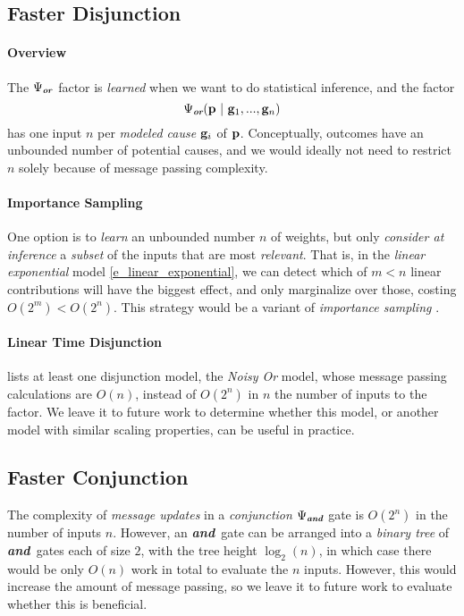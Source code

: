 \documentclass[11pt]{article}
\newcommand{\pvariable}{{\bf p}}
\newcommand{\gvariable}{{\bf g}}
\newcommand{\condsep}{\ |\ }
\newcommand{\opand}{\textbf{\em and}}
\newcommand{\opor}{\textbf{\em or}}
\begin{document}
\subsection{Faster Disjunction}
\label{sec:noisy_or}
\paragraph{Overview}
The $\Psi_\opor$ factor is {\em learned} when we want to do statistical inference, and the factor
\[\Psi_\opor(\pvariable \condsep \gvariable_1, ..., \gvariable_n)\]
has one input $n$ per {\em modeled cause} $\gvariable_i$ of $\pvariable$.
Conceptually, outcomes have an unbounded number of potential causes, and we would ideally not need to restrict $n$ solely because of message passing complexity.
\paragraph{Importance Sampling}
One option is to {\em learn} an unbounded number $n$ of weights, but only {\em consider at inference} a {\em subset} of the inputs that are most {\em relevant}.
That is, in the {\em linear exponential} model \ref{e_linear_exponential}, we can detect which of $m < n$ linear contributions will have the biggest effect, and only marginalize over those, costing $O(2^m) < O(2^n)$.
This strategy would be a variant of {\em importance sampling} \cite{wilkinson2005grammar}.
\paragraph{Linear Time Disjunction}
\cite{neapolitan2003learning} lists at least one disjunction model, the {\em Noisy Or} model, whose message passing calculations are $O(n)$, instead of $O(2^n)$ in $n$ the number of inputs to the factor.
We leave it to future work to determine whether this model, or another model with similar scaling properties, can be useful in practice.

\subsection{Faster Conjunction}
The complexity of {\em message updates} in a {\em conjunction} $\Psi_\opand$ gate is $O(2^n)$ in the number of inputs $n$.
However, an \opand\ gate can be arranged into a {\em binary tree} of \opand\ gates each of size $2$, with the tree height $\log_2(n)$, in which case there would be only $O(n)$ work in total to evaluate the $n$ inputs.
However, this would increase the amount of message passing, so we leave it to future work to evaluate whether this is beneficial.
\end{document}
